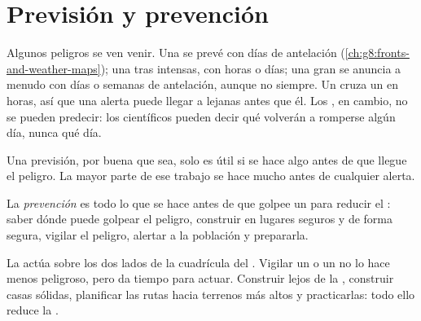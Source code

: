 \section{Previsión y prevención}

Algunos peligros se ven venir. Una  se prevé con días de
antelación (\cref{ch:g8:fronts-and-weather-maps}); una  tras
 intensas, con horas o días; una gran  se anuncia a menudo
con días o semanas de antelación, aunque no siempre. Un  cruza un
 en horas, así que una alerta puede llegar a  lejanas antes
que él. Los , en cambio, no se pueden predecir: los científicos
pueden decir qué  volverán a romperse algún día, nunca qué día.

Una previsión, por buena que sea, solo es útil si se hace algo antes de
que llegue el peligro. La mayor parte de ese trabajo se hace mucho antes de
cualquier alerta.

\begin{definition}[Prevención]\label{def:g9:natural-risks:prevention}
La \emph{prevención} es todo lo que se hace
antes de que golpee un  para reducir el : saber dónde
puede golpear el peligro, construir en lugares seguros y de forma segura,
vigilar el peligro, alertar a la población y prepararla.
\end{definition}

La  actúa sobre los dos lados de la cuadrícula del .
Vigilar un  o un  no lo hace menos peligroso, pero da tiempo para
actuar. Construir lejos de la , construir casas
sólidas, planificar las rutas hacia terrenos más altos y practicarlas:
todo ello reduce la .

